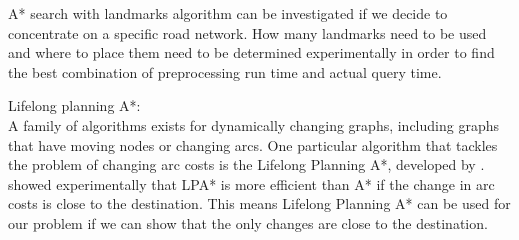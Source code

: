 A* search with landmarks algorithm can be investigated
if we decide to concentrate on a specific road network.
How many landmarks need to be used and where to place them need to be 
determined experimentally in order to find the best combination of preprocessing run time and actual query time.


Lifelong planning A*:\\
A family of algorithms exists for dynamically changing graphs,
including graphs that have moving nodes or changing arcs.
One particular algorithm that tackles the problem of changing arc costs is the Lifelong Planning A*, developed by \citet{LPA*}.
\citet{LPA*} showed experimentally that LPA* is more efficient than A* if the change in arc costs is close to the destination.
This means Lifelong Planning A* can be used for our problem if we can show that the only changes are close to the destination.
